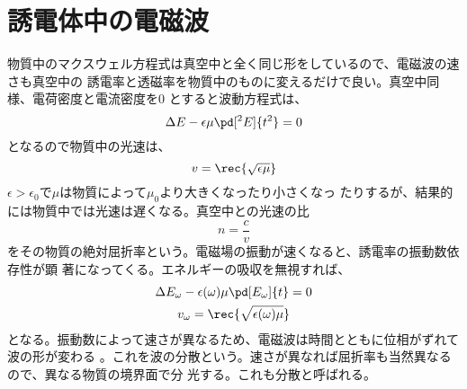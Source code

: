     \section{誘電体中の電磁波}
        物質中のマクスウェル方程式は真空中と全く同じ形をしているので、電磁波の速さも真空中の
        誘電率と透磁率を物質中のものに変えるだけで良い。真空中同様、電荷密度と電流密度を0
        とすると波動方程式は、
            \[\Delta E - \epsilon\mu\pd[^2E]{t^2} = 0\]
        となるので物質中の光速は、
            \[v = \rec{\sqrt{\epsilon\mu}}\]
        $\epsilon > \epsilon_0$で$\mu$は物質によって$\mu_0$より大きくなったり小さくなっ
        たりするが、結果的には物質中では光速は遅くなる。真空中との光速の比
            \[n = \frac{c}{v}\]
        をその物質の絶対屈折率という。電磁場の振動が速くなると、誘電率の振動数依存性が顕
        著になってくる。エネルギーの吸収を無視すれば、
        \begin{gather*}
            \Delta E_\omega - \epsilon(\omega)\mu\pd[E_\omega]{t} = 0\\
            v_\omega = \rec{\sqrt{\epsilon(\omega)\mu}}\\
        \end{gather*}
        となる。振動数によって速さが異なるため、電磁波は時間とともに位相がずれて波の形が変わる
        。これを波の分散という。速さが異なれば屈折率も当然異なるので、異なる物質の境界面で分
        光する。これも分散と呼ばれる。
